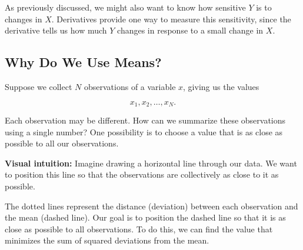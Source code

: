 \documentclass[12pt]{article}
\begin{document}
As previously discussed, we might also want to know how sensitive $Y$ is to changes in $X$. Derivatives provide one way to measure this sensitivity, since the derivative tells us how much $Y$ changes in response to a small change in $X$.

\subsection{Why Do We Use Means?}

Suppose we collect $N$ observations of a variable
$x$, giving us the values

\[
x_1,x_2,\ldots,x_N.
\]

Each observation may be different.
How can we summarize these observations
using a single number? One possibility is to choose a value that is as close as possible to all our observations.

\medskip

\noindent
\textbf{Visual intuition:} Imagine drawing
a horizontal line through our data.
We want to position this line so that
the observations are collectively as close
to it as possible.

\begin{center}
\end{center}

The dotted lines represent the distance (deviation) between each observation and the mean (dashed line). Our goal is to position the dashed line so that it is as close as possible to all observations. To do this, we can find the value that minimizes the sum of squared deviations from the mean.
\end{document}
